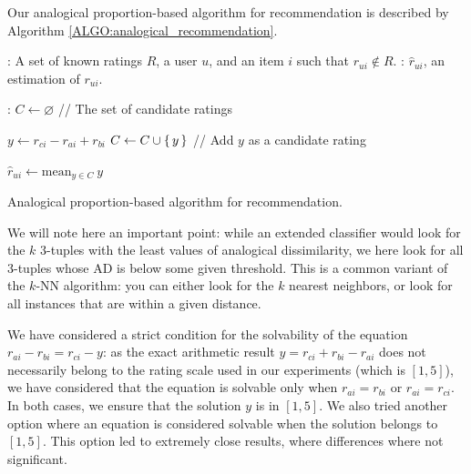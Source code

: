 Our analogical proportion-based algorithm for recommendation is described by
Algorithm \ref{ALGO:analogical_recommendation}.
 \begin{algorithm}[!ht]
       \begin{algorithmic}

      : A set of known ratings $R$, a user $u$, and an item
         $i$ such that $r_{ui} \notin R$.
      : $\hat{r}_{ui}$, an estimation of $r_{ui}$.

      :
      \STATE $C \leftarrow \varnothing$ \quad \quad // The set of candidate ratings

      \STATE  $y \leftarrow r_{ci} - r_{ai} + r_{bi}$
      \STATE $C \gets C \cup \set{y}$ \quad // Add $y$ as a candidate rating
	  \ENDFOR

         \STATE $\hat{r}_{ui} \leftarrow \text{mean}_{y \in C} ~y$

\end{algorithmic}
     \caption{Analogical proportion-based algorithm for recommendation.}
       \label{ALGO:analogical_recommendation}
\end{algorithm}

We will note here an important point: while an extended classifier would look
for the $k$ $3$-tuples with the least values of analogical dissimilarity, we
here look for all $3$-tuples whose AD is below some given threshold. This is
a common variant of the $k$-NN algorithm: you can either look for the $k$
nearest neighbors, or look for all instances that are within a given distance.

We have considered a strict condition for the solvability of the equation
$r_{ai} - r_{bi} = r_{ci} - y$: as the exact arithmetic result $y=r_{ci} +
r_{bi} -r_{ai}$ does not necessarily belong to the rating scale used in our
experiments (which is $[1,5]$), we have considered that the equation is
solvable only when $r_{ai}=r_{bi}$ or $r_{ai}=r_{ci}$. In both cases, we ensure
that the solution $y$ is in $[1,5]$.  We also tried another option where an
equation is considered solvable when the solution belongs to $[1, 5]$. This
option led to extremely close results, where differences where not significant.

